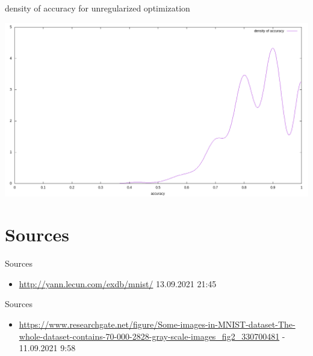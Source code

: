 \documentclass{beamer}
\begin{document}
\begin{frame}{density of accuracy for unregularized optimization}
\begin{center}
	\includegraphics[scale=0.31]{source/density_unregularized.png}
\end{center}
\end{frame}


\section{Sources}
\begin{frame}{Sources}
\tiny
\begin{itemize}
	\item \url{http://yann.lecun.com/exdb/mnist/} 13.09.2021 21:45
\end{itemize}
\end{frame}

\begin{frame}{Sources}
\tiny
\begin{itemize}
	\item \url{https://www.researchgate.net/figure/Some-images-in-MNIST-dataset-The-whole-dataset-contains-70-000-2828-gray-scale-images_fig2_330700481} - 11.09.2021 9:58
\end{itemize}
\end{frame}
\end{document}
